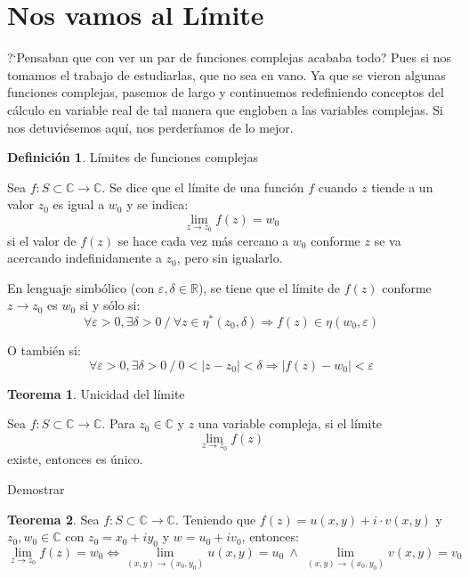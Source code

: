 \documentclass[12pt]{article}
\theoremstyle{definition}
\newtheorem{definition}{Definici\'on}[section]
\theoremstyle{theorem}
\newtheorem{theorem}{Teorema}[section]
\begin{document}
\section{Nos vamos al L\'imite}
?`Pensaban que con ver un par de funciones complejas acababa todo? Pues si nos tomamos el trabajo de estudiarlas, que no sea en vano. Ya que se vieron algunas funciones complejas, pasemos de largo y continuemos redefiniendo conceptos del c\'alculo en variable real de tal manera que engloben a las variables complejas. Si nos detuvi\'esemos aqu\'i, nos perder\'iamos de lo mejor.\\

\colorbox{yellow!40!white!80}{\parbox{\linewidth}{
\theoremstyle{definition}
\begin{definition}{L\'imites de funciones complejas}

Sea $f: S \subset \mathbb{C} \rightarrow \mathbb{C}$. Se dice que el l\'imite de una funci\'on $f$ cuando $z$ tiende a un valor $z_0$ es igual a $w_0$ y se indica:
$$\lim\limits _{z\rightarrow z_0} f(z) = w_0$$
si el valor de $f(z)$ se hace cada vez m\'as cercano a $w_0$ conforme $z$ se va acercando indefinidamente a $z_0$, pero sin igualarlo.

En lenguaje simb\'olico (con $\varepsilon, \delta \in \mathbb{R}$), se tiene que el l\'imite de $f(z)$ conforme $z \rightarrow z_0$ es $w_0$ si y s\'olo si:
$$\forall \varepsilon >0, \exists \delta > 0\ /\ \forall z \in \eta^*(z_0, \delta) \Rightarrow f(z) \in \eta(w_0, \varepsilon)$$

O tambi\'en si:
$$\forall \varepsilon >0, \exists \delta > 0\ /\ 0<|z-z_0|<\delta \Rightarrow |f(z)-w_0|<\varepsilon$$

\end{definition}}}
\linebreak
\linebreak

\colorbox{orange!40!white!80}{\parbox{\linewidth}{
\theoremstyle{theorem}
\begin{theorem}{Unicidad del l\'imite}

Sea $f: S \subset \mathbb{C} \rightarrow \mathbb{C}$. Para $z_0 \in \mathbb{C}$ y $z$ una variable compleja, si el l\'imite $$\lim\limits_{z\rightarrow z_0} f(z)$$
existe, entonces es \'unico.
\end{theorem}}}
\linebreak

Demostrar
\linebreak

\colorbox{orange!40!white!80}{\parbox{\linewidth}{
\theoremstyle{theorem}
\begin{theorem}

Sea $f: S \subset \mathbb{C} \rightarrow \mathbb{C}$. Teniendo que $f(z) = u(x, y) + i\cdot v(x, y)$ y $z_0, w_0 \in \mathbb{C}$ con $z_0 = x_0 + iy_0$ y $w = u_0+iv_0$, entonces:
$$\lim\limits_{z\rightarrow z_0} f(z) = w_0 \Leftrightarrow \lim\limits_{(x, y)\rightarrow (x_0, y_0)}u(x,y) = u_0\ \land\ \lim \limits_{(x, y)\rightarrow (x_0, y_0)}v(x,y) = v_0$$
\end{theorem}}}
\linebreak
\end{document}
